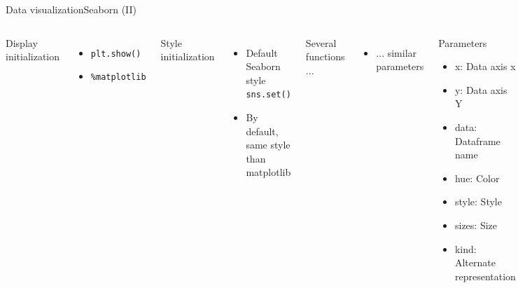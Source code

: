 \documentclass[10pt,compress]{beamer} %
\begin{document}
\begin{frame}[fragile]{Data visualization}{Seaborn (II)}
	\begin{columns}
	Display initialization
	\begin{itemize}
		\item \texttt{plt.show()}
		\item \texttt{\%matplotlib}
	\end{itemize}
	Style initialization
	\begin{itemize}
		\item Default Seaborn style \texttt{sns.set()}
		\item By default, same style than matplotlib
	\end{itemize}
	Several functions ...
	\begin{itemize}
		\item ... similar parameters
	\end{itemize}

	\begin{block}{Parameters}
	\begin{itemize}
		\item x: Data axis x
		\item y: Data axis Y
		\item data: Dataframe name
		\item hue: Color
		\item style: Style
		\item sizes: Size
		\item kind: Alternate representation
	\end{itemize}
	\end{block}
	\end{columns}
\end{frame}
\end{document}
